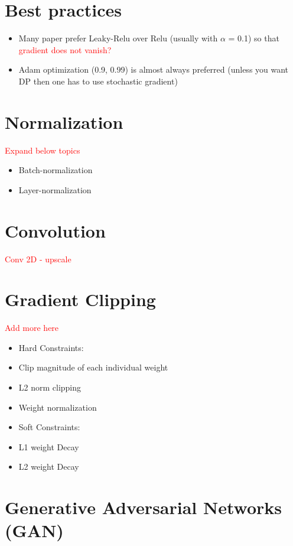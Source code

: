 \documentclass[11pt]{article}
\newcommand{\red}[1]{\textcolor{red}{#1}}
\begin{document}
\tableofcontents
\newpage
    \section{Best practices}
    \begin{itemize}
        \item Many paper prefer Leaky-Relu over Relu (usually with $\alpha$ = 0.1) so that \red{gradient does not vanish?}
        \item Adam optimization (0.9, 0.99) is almost always preferred (unless you want DP then one has to use stochastic gradient)
    \end{itemize}


    \section{Normalization}
    \red{Expand below topics}
    \begin{itemize}
        \item Batch-normalization
        \item Layer-normalization
    \end{itemize}


    \section{Convolution}
    \red{Conv 2D - upscale}


    \section{Gradient Clipping}
    \red{Add more here}
    \begin{itemize}
        \item Hard Constraints:
        \item Clip magnitude of each individual weight
        \item L2 norm clipping
        \item Weight normalization
        \item Soft Constraints:
        \item L1 weight Decay
        \item L2 weight Decay
    \end{itemize}


    \section{Generative Adversarial Networks (GAN)}
\end{document}
